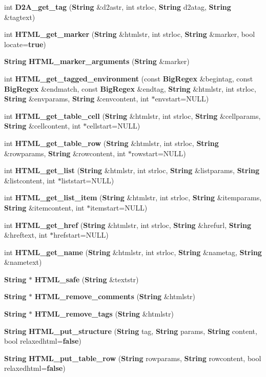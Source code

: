 \begin{CompactItemize}
\item 
int {\bf D2A\_\-get\_\-tag} ({\bf String} \&d2astr, int strloc, {\bf String} d2atag, {\bf String} \&tagtext)
\item 
int {\bf HTML\_\-get\_\-marker} ({\bf String} \&htmlstr, int strloc, {\bf String} \&marker, bool locate={\bf true})
\item 
{\bf String} {\bf HTML\_\-marker\_\-arguments} ({\bf String} \&marker)
\item 
int {\bf HTML\_\-get\_\-tagged\_\-environment} (const {\bf Big\-Regex} \&begintag, const {\bf Big\-Regex} \&endmatch, const {\bf Big\-Regex} \&endtag, {\bf String} \&htmlstr, int strloc, {\bf String} \&envparams, {\bf String} \&envcontent, int $\ast$envstart=NULL)
\item 
int {\bf HTML\_\-get\_\-table\_\-cell} ({\bf String} \&htmlstr, int strloc, {\bf String} \&cellparams, {\bf String} \&cellcontent, int $\ast$cellstart=NULL)
\item 
int {\bf HTML\_\-get\_\-table\_\-row} ({\bf String} \&htmlstr, int strloc, {\bf String} \&rowparams, {\bf String} \&rowcontent, int $\ast$rowstart=NULL)
\item 
int {\bf HTML\_\-get\_\-list} ({\bf String} \&htmlstr, int strloc, {\bf String} \&listparams, {\bf String} \&listcontent, int $\ast$liststart=NULL)
\item 
int {\bf HTML\_\-get\_\-list\_\-item} ({\bf String} \&htmlstr, int strloc, {\bf String} \&itemparams, {\bf String} \&itemcontent, int $\ast$itemstart=NULL)
\item 
int {\bf HTML\_\-get\_\-href} ({\bf String} \&htmlstr, int strloc, {\bf String} \&hrefurl, {\bf String} \&hreftext, int $\ast$hrefstart=NULL)
\item 
int {\bf HTML\_\-get\_\-name} ({\bf String} \&htmlstr, int strloc, {\bf String} \&nametag, {\bf String} \&nametext)
\item 
{\bf String} $\ast$ {\bf HTML\_\-safe} ({\bf String} \&textstr)
\item 
{\bf String} $\ast$ {\bf HTML\_\-remove\_\-comments} ({\bf String} \&htmlstr)
\item 
{\bf String} $\ast$ {\bf HTML\_\-remove\_\-tags} ({\bf String} \&htmlstr)
\item 
{\bf String} {\bf HTML\_\-put\_\-structure} ({\bf String} tag, {\bf String} params, {\bf String} content, bool relaxedhtml={\bf false})
\item 
{\bf String} {\bf HTML\_\-put\_\-table\_\-row} ({\bf String} rowparams, {\bf String} rowcontent, bool relaxedhtml={\bf false})

\end{CompactItemize}

